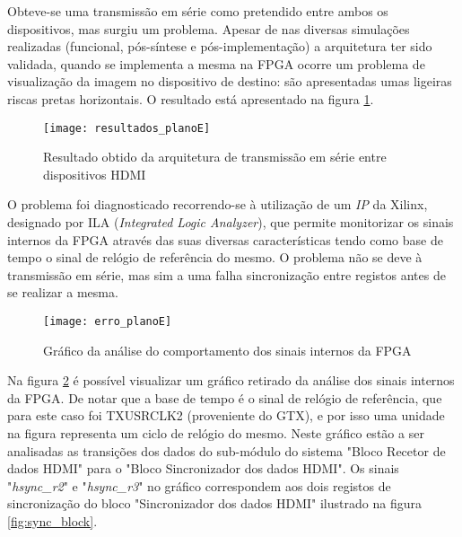 
Obteve-se uma transmissão em série como pretendido entre ambos os dispositivos, mas surgiu um problema. Apesar de nas diversas simulações realizadas (funcional, pós-síntese e pós-implementação) a arquitetura ter sido validada, quando se implementa a mesma na FPGA ocorre um problema de visualização da imagem no dispositivo de destino: são apresentadas umas ligeiras riscas pretas horizontais. O resultado está apresentado na figura \ref{fig:planoE_results}.


\begin{figure}
	\begin{center}
	\leavevmode
	\texttt{[image: resultados\_planoE]}
	\captionsetup{width=1.0\linewidth}
	\caption[Resultado obtido da arquitetura de transmissão em série entre dispositivos HDMI]{Resultado obtido da arquitetura de transmissão em série entre dispositivos HDMI}
	\label{fig:planoE_results}
\end{center}
\end{figure}

O problema foi diagnosticado recorrendo-se à utilização de um \textit{IP} da Xilinx, designado por ILA (\textit{Integrated Logic Analyzer}), que permite monitorizar os sinais internos da FPGA através das suas diversas características tendo como base de tempo o sinal de relógio de referência do mesmo. O problema não se deve à transmissão em série, mas sim a uma falha sincronização entre registos antes de se realizar a mesma.

\begin{figure}
	\begin{center}
		\leavevmode
		\texttt{[image: erro\_planoE]}
		\captionsetup{width=1.0\linewidth}
		\caption[Gráfico da análise do comportamento dos sinais internos da FPGA]{Gráfico da análise do comportamento dos sinais internos da FPGA}
		\label{fig:planoE_rerro}
	\end{center}
\end{figure}

Na figura \ref{fig:planoE_rerro} é possível visualizar um gráfico retirado da análise dos sinais internos da FPGA. De notar que a base de tempo é o sinal de relógio de referência, que para este caso foi TXUSRCLK2 (proveniente do GTX), e por isso uma unidade na figura representa um ciclo de relógio do mesmo.  Neste gráfico estão a ser analisadas as transições dos dados do sub-módulo do sistema "Bloco Recetor de dados HDMI" para o "Bloco Sincronizador dos dados HDMI". Os sinais "\textit{hsync\_r2}" e "\textit{hsync\_r3}" no gráfico correspondem aos dois registos de sincronização do bloco "Sincronizador dos dados HDMI" ilustrado na figura \ref{fig:sync_block}.

